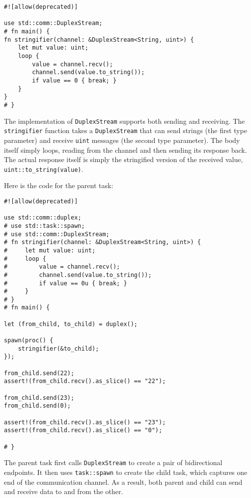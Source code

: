 \documentclass[]{article}
\begin{document}
\begin{verbatim}
#![allow(deprecated)]

use std::comm::DuplexStream;
# fn main() {
fn stringifier(channel: &DuplexStream<String, uint>) {
    let mut value: uint;
    loop {
        value = channel.recv();
        channel.send(value.to_string());
        if value == 0 { break; }
    }
}
# }
\end{verbatim}

The implementation of \texttt{DuplexStream} supports both sending and
receiving. The \texttt{stringifier} function takes a
\texttt{DuplexStream} that can send strings (the first type parameter)
and receive \texttt{uint} messages (the second type parameter). The body
itself simply loops, reading from the channel and then sending its
response back. The actual response itself is simply the stringified
version of the received value, \texttt{uint::to\_string(value)}.

Here is the code for the parent task:

\begin{verbatim}
#![allow(deprecated)]

use std::comm::duplex;
# use std::task::spawn;
# use std::comm::DuplexStream;
# fn stringifier(channel: &DuplexStream<String, uint>) {
#     let mut value: uint;
#     loop {
#         value = channel.recv();
#         channel.send(value.to_string());
#         if value == 0u { break; }
#     }
# }
# fn main() {

let (from_child, to_child) = duplex();

spawn(proc() {
    stringifier(&to_child);
});

from_child.send(22);
assert!(from_child.recv().as_slice() == "22");

from_child.send(23);
from_child.send(0);

assert!(from_child.recv().as_slice() == "23");
assert!(from_child.recv().as_slice() == "0");

# }
\end{verbatim}

The parent task first calls \texttt{DuplexStream} to create a pair of
bidirectional endpoints. It then uses \texttt{task::spawn} to create the
child task, which captures one end of the communication channel. As a
result, both parent and child can send and receive data to and from the
other.
\end{document}
